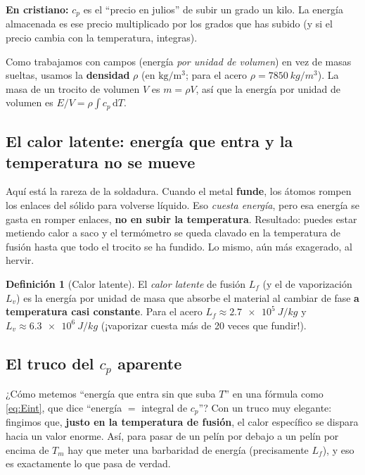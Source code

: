 \documentclass[11pt]{article}
\newcommand{\dd}{\mathrm{d}}
\theoremstyle{definition}
\newtheorem{definicion}{Definición}[section]
\theoremstyle{plain}
\newcommand{\dummies}[1]{%
  \par\smallskip\noindent
  \colorbox{yellow!18}{\parbox{\dimexpr\linewidth-2\fboxsep}{%
  \small\textbf{En cristiano:} #1}}\par\smallskip}
\begin{document}
\dummies{$c_p$ es el ``precio en julios'' de subir un grado un kilo. La energía
almacenada es ese precio multiplicado por los grados que has subido (y si el precio
cambia con la temperatura, integras).}

Como trabajamos con campos (energía \emph{por unidad de volumen}) en vez de masas
sueltas, usamos la \textbf{densidad} $\rho$ (en $\mathrm{kg/m^3}$; para el acero
$\rho=\SI{7850}{kg/m^3}$). La masa de un trocito de volumen $V$ es $m=\rho V$, así
que la energía por unidad de volumen es $E/V = \rho\int c_p\,\dd T$.

\subsection{El calor latente: energía que entra y la temperatura no se mueve}

Aquí está la rareza de la soldadura. Cuando el metal \textbf{funde}, los átomos
rompen los enlaces del sólido para volverse líquido. Eso \emph{cuesta energía},
pero esa energía se gasta en romper enlaces, \textbf{no en subir la temperatura}.
Resultado: puedes estar metiendo calor a saco y el termómetro se queda clavado en
la temperatura de fusión hasta que todo el trocito se ha fundido. Lo mismo, aún más
exagerado, al hervir.

\begin{definicion}[Calor latente]
El \emph{calor latente} de fusión $L_f$ (y el de vaporización $L_v$) es la energía
por unidad de masa que absorbe el material al cambiar de fase \textbf{a temperatura
casi constante}. Para el acero $L_f\approx\SI{2.7e5}{J/kg}$ y
$L_v\approx\SI{6.3e6}{J/kg}$ (¡vaporizar cuesta más de 20 veces que fundir!).
\end{definicion}

\subsection{El truco del $c_p$ aparente}

¿Cómo metemos ``energía que entra sin que suba $T$'' en una fórmula como
\eqref{eq:Eint}, que dice ``energía $=$ integral de $c_p$''? Con un truco muy
elegante: fingimos que, \textbf{justo en la temperatura de fusión}, el calor
específico se dispara hacia un valor enorme. Así, para pasar de un pelín por debajo
a un pelín por encima de $T_m$ hay que meter una barbaridad de energía
(precisamente $L_f$), y eso es exactamente lo que pasa de verdad.
\end{document}
